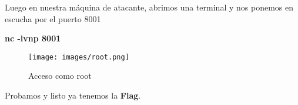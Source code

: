 \documentclass[a4paper]{article} %
\begin{document}
    \vspace{2.5cm}

    Luego en nuestra máquina de atacante, abrimos una terminal y nos ponemos en escucha por el puerto 8001

    \textbf{ nc -lvnp 8001}

    \vspace{5cm}

    \begin{figure}[h] %
        \centering
        \texttt{[image: images/root.png]}
        \caption{Acceso como root} %
    \end{figure}\par\vspace{0cm}

    Probamos y listo ya tenemos la \textbf{Flag}.
\end{document}
